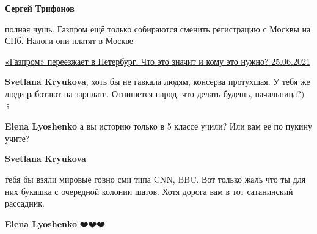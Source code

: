 \begin{itemize}
\begin{itemize}
\textbf{Сергей Трифонов} 

полная чушь. Газпром ещё только собираются сменить регистрацию с Москвы на СПб.
Налоги они платят в Москве

\href{https://www.rbc.ru/spb_sz/25/06/2021/60d5d8099a7947a1db2da695}{%
«Газпром» переезжает в Петербург. Что это значит и кому это нужно? 25.06.2021}

 
\textbf{Svetlana Kryukova}, хоть бы не гавкала людям, консерва протухшая. У тебя же люди работают на зарплате. Отпишется народ, что делать будешь, начальница?)🤦🏼♀️

 
\textbf{Elena Lyoshenko} а вы историю только в 5 классе учили? Или вам ее по пукину учите?

 
\textbf{Svetlana Kryukova} 

тебя бы взяли мировые говно сми типа CNN, BBC. Вот только жаль что ты для них
букашка с очередной колонии шатов. Хотя дорога вам в тот сатанинский рассадник.


 
\textbf{Elena Lyoshenko} ❤️❤️❤️

\end{itemize}

\end{itemize}

